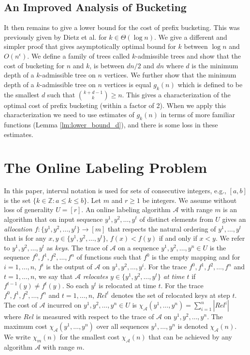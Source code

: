 \documentclass[11pt]{article}
\newcommand{\A}{\mathcal{A}}
\begin{document}
\subsection{An Improved Analysis of Bucketing}

It then remains to give a lower bound
for the cost of prefix bucketing.  This was previously given by Dietz et al. \cite{DSZ04} for $k\in \Theta(\log n)$.
We give a different and simpler proof that gives asymptotically optimal bound for $k$ between $\log n$ and $O(n^\epsilon)$.
We define a family of trees called $k$-admissible trees and show that the cost
of bucketing  for $n$ and $k$, is between $dn/2$ and $dn$ where $d$ is the minimum depth of a $k$-admissible tree
on $n$ vertices.  We further show that the minimum depth of a $k$-admissible tree on $n$ vertices
is equal $g_k(n)$ which is defined to be the smallest $d$ such that $\binom{k+d-1}{k} \geq n$.
This gives a  characterization of the optimal cost of prefix bucketing (within a factor of 2).  When we apply
this characterization we need to use estimates of $g_k(n)$ in terms of more familiar functions (Lemma \ref{lm:lower_bound_d}),
and there is some loss in these estimates.

\section{The Online Labeling Problem}\label{s-olp}

In this paper, interval notation is used for sets of consecutive integers, e.g.,
$[a,b]$ is the set $\{k \in \mathbb{Z}:a \leq k \leq b\}$. Let $m$ and $r\ge 1$ be integers. We assume without loss of generality $U=[r]$.
An online labeling algorithm $\A$ with range $m$ is an algorithm that on input sequence $y^1,y^2,\dotsc,y^t$ of distinct elements
from $U$ gives
an \emph{allocation $f : \{y^1,y^2,\dotsc,y^t\} \rightarrow [m]$} that respects the natural ordering of $y^1,\dotsc,y^t$
that is for any $x,y\in \{y^1,y^2,\dotsc,y^t\}$, $f(x) < f(y)$ if and only if $x < y$. We refer to $y^1,y^2,\dotsc,y^t$
as \emph{keys}. The trace of $\A$ on a sequence $y^1,y^2,\dotsc,y^n\in U$ is the sequence $f^0,f^1,f^2,\dotsc,f^n$ of functions
such that $f^0$ is the empty mapping and for $i=1,\dotsc,n$, $f^i$ is the output of $\A$ on $y^1,y^2,\dotsc,y^i$.
For the trace $f^0,f^1,f^2,\dotsc,f^n$ and $t=1,\dotsc,n$, we say that $\A$ \emph{relocates $y\in \{y^1,y^2,\dotsc,y^t\}$ at time $t$}
if $f^{t-1}(y)\not=f^t(y)$. So each $y^t$ is relocated at time $t$.
For the trace $f^0,f^1,f^2,\dotsc,f^n$ and $t=1,\dotsc,n$, $Rel^t$ denotes the set of relocated keys at step $t$.
The cost of $\A$ incurred on $y^1,y^2,\dotsc,y^n\in U$ is $\chi_\A(y^1,\dotsc,y^n)=\sum_{i=1}^n |Rel^i|$ where $Rel$ is
measured with respect to the trace of $\A$ on $y^1,y^2,\dotsc,y^n$. The maximum cost
$\chi_\A(y^1,\dotsc,y^n)$ over all sequences $y^1,\dotsc,y^n$ is denoted $\chi_\A(n)$. We write $\chi_m(n)$ for the smallest cost $\chi_\A(n)$ that
can be achieved by any algorithm $\A$ with range $m$.
\end{document}
